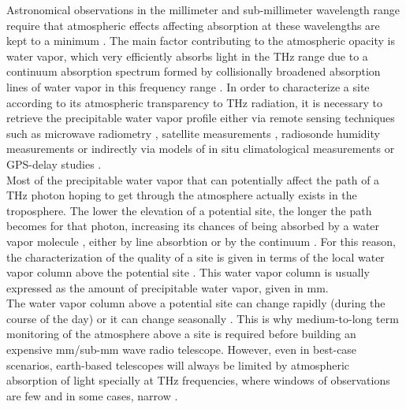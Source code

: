 \documentclass[12pt]{iopart}
\begin{document}
Astronomical observations in the millimeter and sub-millimeter wavelength range require that atmospheric effects affecting absorption at these wavelengths are kept to a minimum \cite{southpole,radford2016,chajpwv}. The main factor contributing to the atmospheric opacity is water vapor, which very efficiently absorbs light in the THz range \cite{pardocerni,pardocerni2,cont350} due to a continuum absorption spectrum formed by collisionally broadened absorption lines of water vapor in this frequency range  \cite{linecont}. In order to characterize a site according to its atmospheric transparency to THz radiation, it is necessary to retrieve the precipitable water vapor profile either via remote sensing techniques such as microwave radiometry \cite{radiometer,paine2000fourier,southpole2}, satellite measurements \cite{aqua,spacemols,suen2014,spaceradio}, radiosonde humidity measurements \cite{radiosonde,radiosonde2} or indirectly via models of in situ climatological measurements \cite{climatology} or GPS-delay studies \cite{gpsorig,gpsmap}. \\

Most of the precipitable water vapor that can potentially affect the path of a THz photon hoping to get through the atmosphere actually exists in the troposphere. The lower the elevation of a potential site, the longer the path becomes for that photon, increasing its chances of being absorbed by a water vapor molecule \cite{liebe1989mpm,linecont,lababs}, either by line absorbtion \cite{submmlines} or by the continuum \cite{turner2009}. For this reason, the characterization of the quality of a site is given in terms of the local water vapor column above the potential site \cite{mkradio,southpole3,he2012,atacama}. This water vapor column is usually expressed as the amount of precipitable water vapor, given in mm.\\

The water vapor column above a potential site can change rapidly (during the course of the day) or it can change seasonally \cite{arm2013,caumont2016}. This is why medium-to-long term monitoring of the atmosphere above a site is required before building an expensive mm/sub-mm wave radio telescope. However, even in best-case scenarios, earth-based telescopes will always be limited by atmospheric absorption of light specially at THz frequencies, where windows of observations are few and in some cases, narrow \cite{arrlim,limits}. \\
\end{document}
